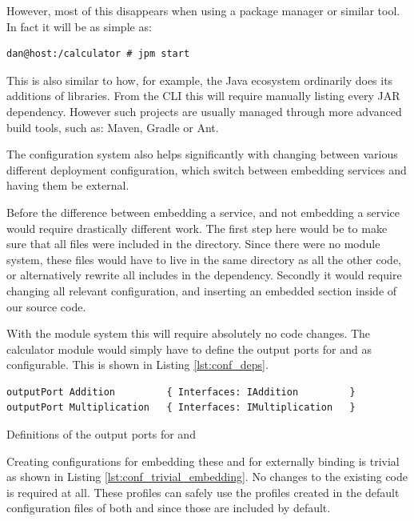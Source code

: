 However, most of this disappears when using a package manager or similar tool.
In fact it will be as simple as:

\begin{verbatim}
dan@host:/calculator # jpm start
\end{verbatim}

This is also similar to how, for example, the Java ecosystem ordinarily does
its additions of libraries. From the CLI this will require manually listing
every JAR dependency. However such projects are usually managed through more
advanced build tools, such as: Maven, Gradle or Ant.

The configuration system also helps significantly with changing between various
different deployment configuration, which switch between embedding services and
having them be external.

Before the difference between embedding a service, and not embedding a service
would require drastically different work. The first step here would be to make
sure that all files were included in the directory. Since there were no module
system, these files would have to live in the same directory as all the other
code, or alternatively rewrite all includes in the dependency.
Secondly it would require changing all relevant configuration, and inserting
an embedded section inside of our source code.

With the module system this will require absolutely no code changes. The
calculator module would simply have to define the output ports for
 and  as configurable. This is shown in
Listing \ref{lst:conf_deps}.

\begin{listing}[H]
\begin{verbatim}
outputPort Addition         { Interfaces: IAddition         }
outputPort Multiplication   { Interfaces: IMultiplication   }
\end{verbatim}
\caption{Definitions of the output ports for  and
    }
\label{lst:conf_deps}

\end{listing}

Creating configurations for embedding these and for externally binding is
trivial as shown in Listing \ref{lst:conf_trivial_embedding}. No changes to the
existing code is required at all. These profiles can safely use the
 profiles created in the default configuration files of both
 and  since those are included by default.

